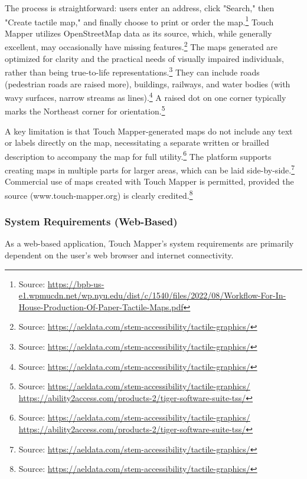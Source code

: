 The process is straightforward: users enter an address, click "Search," then "Create tactile map," and finally choose to print or order the map.\footnote{Source:  \url{https://bpb-us-e1.wpmucdn.net/wp.nyu.edu/dist/c/1540/files/2022/08/Workflow-For-In-House-Production-Of-Paper-Tactile-Maps.pdf}} Touch Mapper utilizes OpenStreetMap data as its source, which, while generally excellent, may occasionally have missing features.\footnote{Source:  \url{https://aeldata.com/stem-accessibility/tactile-graphics/}} The maps generated are optimized for clarity and the practical needs of visually impaired individuals, rather than being true-to-life representations.\footnote{Source:  \url{https://aeldata.com/stem-accessibility/tactile-graphics/}} They can include roads (pedestrian roads are raised more), buildings, railways, and water bodies (with wavy surfaces, narrow streams as lines).\footnote{Source:  \url{https://aeldata.com/stem-accessibility/tactile-graphics/}} A raised dot on one corner typically marks the Northeast corner for orientation.\footnote{Source:  \url{https://aeldata.com/stem-accessibility/tactile-graphics/} \url{https://ability2access.com/products-2/tiger-software-suite-tss/}}

A key limitation is that Touch Mapper-generated maps do not include any text or labels directly on the map, necessitating a separate written or brailled description to accompany the map for full utility.\footnote{Source:  \url{https://aeldata.com/stem-accessibility/tactile-graphics/} \url{https://ability2access.com/products-2/tiger-software-suite-tss/}} The platform supports creating maps in multiple parts for larger areas, which can be laid side-by-side.\footnote{Source:  \url{https://aeldata.com/stem-accessibility/tactile-graphics/}} Commercial use of maps created with Touch Mapper is permitted, provided the source (www.touch-mapper.org) is clearly credited.\footnote{Source:  \url{https://aeldata.com/stem-accessibility/tactile-graphics/}}

\subsubsection{System Requirements (Web-Based)}

As a web-based application, Touch Mapper's system requirements are primarily dependent on the user's web browser and internet connectivity.

